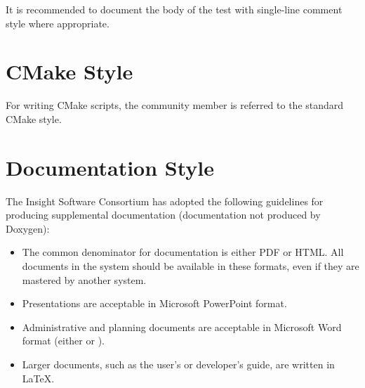 It is recommended to document the body of the test with single-line comment
style where appropriate.


\section{CMake Style}
\label{sec:CMakeStyle}

For writing CMake scripts, the community member is referred to the standard
CMake style.


\section{Documentation Style}
\label{sec:DocumentationStyle}

The Insight Software Consortium has adopted the following guidelines for
producing supplemental documentation (documentation not produced by Doxygen):
\begin{itemize}
\item The common denominator for documentation is either PDF or HTML. All
documents in the system should be available in these formats, even if they are
mastered by another system.
\item Presentations are acceptable in Microsoft PowerPoint format.
\item Administrative and planning documents are acceptable in Microsoft Word
format (either  or ).
\item Larger documents, such as the user's or developer's guide, are written in
\LaTeX.
\end{itemize}
